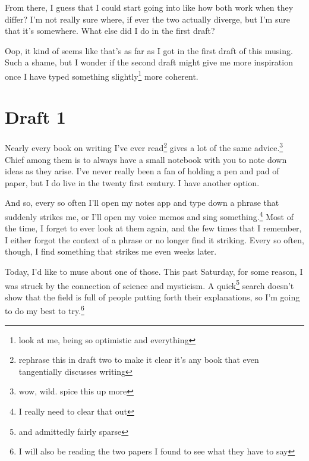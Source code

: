 \documentclass[12pt]{article}[titlepage]
\renewcommand{\,}{\textsuperscript{,}}
\begin{document}
From there, I guess that I could start going into like how both work when they differ? 
I'm not really sure where, if ever the two actually diverge, but I'm sure that it's somewhere.
What else did I do in the first draft?

Oop, it kind of seems like that's as far as I got in the first draft of this musing. Such a shame, but I wonder if the second draft might give me more inspiration once I have typed something slightly\footnote{look at me, being so optimistic and everything} more coherent.
\section{Draft 1}
Nearly every book on writing I've ever read\footnote{rephrase this in draft two to make it clear it's any book that even tangentially discusses writing} gives a lot of the same advice.\footnote{wow, wild. spice this up more}
Chief among them is to always have a small notebook with you to note down ideas as they arise.
I've never really been a fan of holding a pen and pad of paper, but I do live in the twenty first century.
I have another option.

And so, every so often I'll open my notes app and type down a phrase that suddenly strikes me, or I'll open my voice memos and sing something.\footnote{I really need to clear that out}
Most of the time, I forget to ever look at them again, and the few times that I remember, I either forgot the context of a phrase or no longer find it striking.
Every so often, though, I find something that strikes me even weeks later.

Today, I'd like to muse about one of those.
This past Saturday, for some reason, I was struck by the connection of science and mysticism.
A quick\footnote{and admittedly fairly sparse} search doesn't show that the field is full of people putting forth their explanations, so I'm going to do my best to try.\footnote{I will also be reading the two papers I found to see what they have to say}
\end{document}
